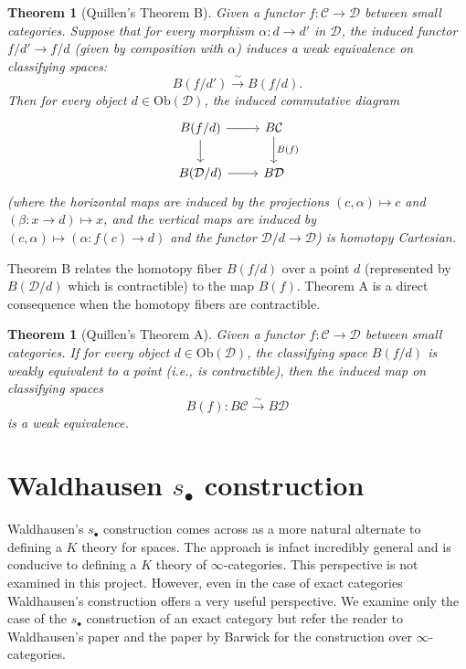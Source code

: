 \documentclass[12pt]{report}
\numberwithin{equation}{section}
\newtheorem{theorem}[dummy]{Theorem}
\begin{document}
	\begin{theorem}[Quillen's Theorem B]
		\label{thm:quillen_B}
		Given a functor $f: \mathcal{C} \to \mathcal{D}$ between small categories. Suppose that for every morphism $\alpha: d \to d'$ in $\mathcal{D}$, the induced functor $f/d' \to f/d$ (given by composition with $\alpha$) induces a weak equivalence on classifying spaces:
		\[ B(f/d') \xrightarrow{\sim} B(f/d). \]
		Then for every object $d \in \mathrm{Ob}(\mathcal{D})$, the induced commutative diagram
		\[
		\begin{tikzcd}
			B(f/d) \arrow{r} \arrow{d} & B\mathcal{C} \arrow{d}{B(f)} \\
			B(\mathcal{D}/d) \arrow{r} & B\mathcal{D}
		\end{tikzcd}
		\]
		(where the horizontal maps are induced by the projections $(c, \alpha) \mapsto c$ and $(\beta: x \to d) \mapsto x$, and the vertical maps are induced by $(c, \alpha) \mapsto (\alpha: f(c) \to d)$ and the functor $\mathcal{D}/d \to \mathcal{D}$) is homotopy Cartesian.
	\end{theorem}
	
	Theorem B relates the homotopy fiber $B(f/d)$ over a point $d$ (represented by $B(\mathcal{D}/d)$ which is contractible) to the map $B(f)$. Theorem A is a direct consequence when the homotopy fibers are contractible.
	
	\begin{theorem}[Quillen's Theorem A]
		\label{thm:quillen_A}
		Given a functor $f: \mathcal{C} \to \mathcal{D}$ between small categories. If for every object $d \in \mathrm{Ob}(\mathcal{D})$, the classifying space $B(f/d)$ is weakly equivalent to a point (i.e., is contractible), then the induced map on classifying spaces
		\[ B(f): B\mathcal{C} \xrightarrow{\sim} B\mathcal{D} \]
		is a weak equivalence.
	\end{theorem}
	
	
	
	
	
	\chapter{Waldhausen \( s_\bullet \) construction}
	
	Waldhausen's \( s_\bullet \) construction comes across as a more natural alternate to defining a \( K \) theory for spaces. The approach is infact incredibly general and is conducive to defining a \( K \) theory of \( \infty \)-categories. This perspective is not examined in this project. However, even in the case of exact categories Waldhausen's construction offers a very useful perspective. We examine only the case of the \( s_\bullet \) construction of an exact category but refer the reader to Waldhausen's paper \cite{10.1007/BFb0074449} and the paper by Barwick \cite{Barwick_2016} for the construction over \( \infty \)-categories.
	
\end{document}
